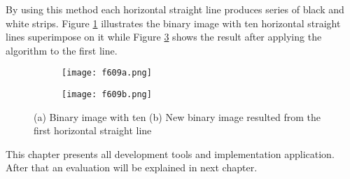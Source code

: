 By using this method each horizontal straight line produces series of black and white strips. Figure \ref{fig:f609a} illustrates the binary image with ten horizontal straight lines superimpose on it while Figure \ref{fig:f609b} shows the result after applying the algorithm to the first line.
\begin{figure}[t]
	\centering
	\begin{subfigure}[b]{0.3\textwidth}
		\texttt{[image: f609a.png]}
		\caption{}\label{fig:f609a}
	\end{subfigure}
	\begin{subfigure}[b]{0.3\textwidth}
		\texttt{[image: f609b.png]}
		\caption{}\label{fig:f609b}
	\end{subfigure}
	\caption{(a) Binary image with ten (b) New binary image resulted from the first horizontal straight line}
\end{figure}

This chapter presents all development tools and implementation application. After that an evaluation will be explained in next chapter.